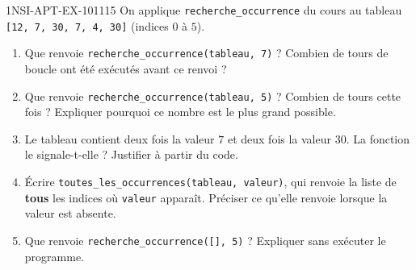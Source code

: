 \begin{exercice}{1NSI-APT-EX-101}{1}{15}
On applique \lstinline{recherche_occurrence} du cours au tableau
\lstinline{[12, 7, 30, 7, 4, 30]} (indices $0$ à $5$).
\begin{enumerate}
  \item Que renvoie \lstinline{recherche_occurrence(tableau, 7)} ? Combien de tours de
    boucle ont été exécutés avant ce renvoi ?
  \item Que renvoie \lstinline{recherche_occurrence(tableau, 5)} ? Combien de tours cette
    fois ? Expliquer pourquoi ce nombre est le plus grand possible.
  \item Le tableau contient deux fois la valeur $7$ et deux fois la valeur $30$. La
    fonction le signale-t-elle ? Justifier à partir du code.
  \item Écrire \lstinline{toutes_les_occurrences(tableau, valeur)}, qui renvoie la liste de
    \textbf{tous} les indices où \lstinline{valeur} apparaît. Préciser ce qu'elle renvoie
    lorsque la valeur est absente.
  \item Que renvoie \lstinline{recherche_occurrence([], 5)} ? Expliquer sans exécuter le
    programme.
\end{enumerate}
\end{exercice}
